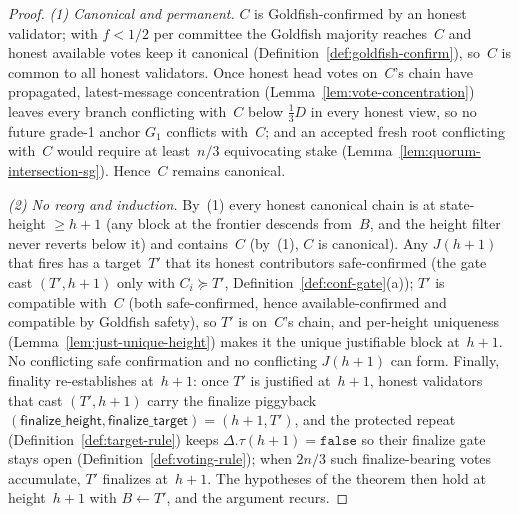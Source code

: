 \ifx\litemode\undefined\documentclass{article}\fi
\newcommand{\finalizeHeight}{\mathsf{finalize\_height}}
\newcommand{\finalizeTarget}{\mathsf{finalize\_target}}
\newcommand{\Dvote}{\ensuremath{D}}         %
\newcommand{\Gone}{\ensuremath{G_{1}}}
\theoremstyle{plain}
\theoremstyle{definition}
\theoremstyle{remark}
\begin{document}
\begin{proof}
\emph{(1) Canonical and permanent.}  \(C\) is Goldfish-confirmed by an honest
validator; with \(f<1/2\) per committee the Goldfish majority reaches~\(C\) and
honest available votes keep it canonical (Definition~\ref{def:goldfish-confirm}),
so~\(C\) is common to all honest validators.
Once honest head votes on~\(C\)'s chain have propagated, latest-message
concentration (Lemma~\ref{lem:vote-concentration}) leaves every branch conflicting
with~\(C\) below \(\tfrac13\Dvote\) in every honest view, so no future grade-1
anchor \(\Gone\) conflicts with~\(C\); and an accepted fresh root conflicting
with~\(C\) would require at least~\(n/3\) equivocating stake
(Lemma~\ref{lem:quorum-intersection-sg}).  Hence~\(C\) remains canonical.

\emph{(2) No reorg and induction.}  By~(1) every honest canonical chain is at
state-height \(\geq h+1\) (any block at the frontier descends from~\(B\), and the
height filter never reverts below it) and contains~\(C\) (by~(1), \(C\) is
canonical).  Any \(J(h+1)\) that fires has a target~\(T'\) that its honest
contributors safe-confirmed (the gate cast \((T',h+1)\) only with \(C_i \succeq T'\),
Definition~\ref{def:conf-gate}(a)); \(T'\) is compatible with~\(C\) (both
safe-confirmed, hence available-confirmed and compatible by Goldfish safety), so
\(T'\) is on~\(C\)'s chain, and per-height uniqueness
(Lemma~\ref{lem:just-unique-height}) makes it the unique justifiable block
at~\(h+1\).  No conflicting safe confirmation and no conflicting \(J(h+1)\) can
form.  Finally, finality re-establishes at~\(h+1\): once \(T'\) is justified
at~\(h+1\), honest validators that cast \((T', h+1)\) carry the finalize piggyback
\((\finalizeHeight, \finalizeTarget) = (h+1, T')\), and the protected repeat
(Definition~\ref{def:target-rule}) keeps \(\Delta.\tau(h+1) = \mathtt{false}\) so
their finalize gate stays open (Definition~\ref{def:voting-rule}); when \(2n/3\)
such finalize-bearing votes accumulate, \(T'\) finalizes at~\(h+1\).  The
hypotheses of the theorem then hold at height~\(h+1\) with \(B \gets T'\), and the
argument recurs.
\end{proof}
\end{document}
